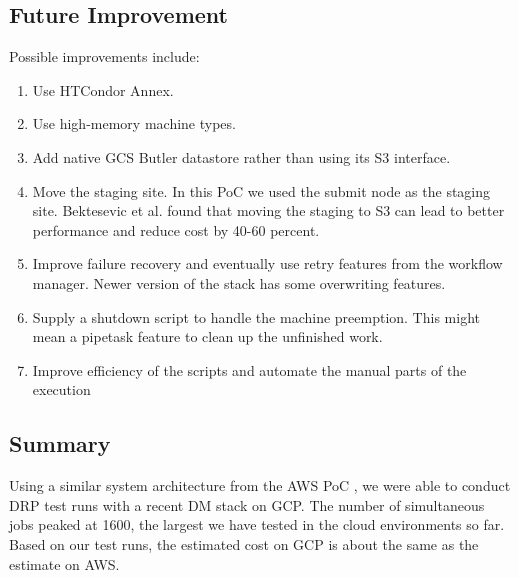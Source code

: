 \subsection{Future Improvement} \label{sec:future}

Possible improvements include:
\begin{enumerate}
\item Use HTCondor Annex.
\item Use high-memory machine types.
\item Add native GCS Butler datastore rather than using its S3 interface.
\item Move the staging site. In this PoC we used the submit node as the staging site. Bektesevic et al. found that moving the staging to S3 can lead to better performance and reduce cost by 40-60 percent.
\item Improve failure recovery and eventually use retry features from the workflow manager. Newer version of the stack has some overwriting features.
\item Supply a shutdown script to handle the machine preemption. This might mean a pipetask feature to clean up the unfinished work.
\item Improve efficiency of the scripts and automate the manual parts of the execution
\end{enumerate}

\subsection{Summary}
Using a similar system architecture from the AWS PoC , we were able to conduct DRP test runs with a recent DM stack on GCP.
The number of simultaneous jobs peaked at 1600, the largest we have tested in the cloud environments so far.
Based on our test runs, the estimated cost on GCP is about the same as the estimate on AWS.
